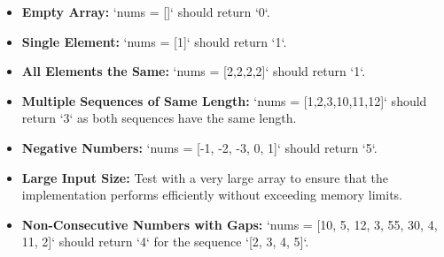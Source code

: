 \begin{itemize}
	\item \textbf{Empty Array:} `nums = []` should return `0`.
	
	\item \textbf{Single Element:} `nums = [1]` should return `1`.
	
	\item \textbf{All Elements the Same:} `nums = [2,2,2,2]` should return `1`.
	
	\item \textbf{Multiple Sequences of Same Length:} `nums = [1,2,3,10,11,12]` should return `3` as both sequences have the same length.
	
	\item \textbf{Negative Numbers:} `nums = [-1, -2, -3, 0, 1]` should return `5`.
	
	\item \textbf{Large Input Size:} Test with a very large array to ensure that the implementation performs efficiently without exceeding memory limits.
	
	\item \textbf{Non-Consecutive Numbers with Gaps:} `nums = [10, 5, 12, 3, 55, 30, 4, 11, 2]` should return `4` for the sequence `[2, 3, 4, 5]`.
\end{itemize}

\printindex